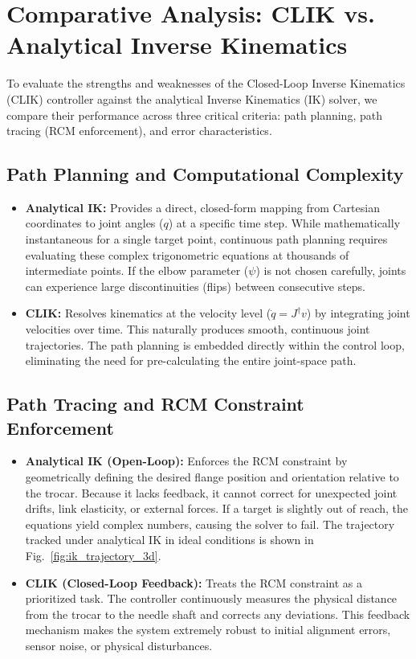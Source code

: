 \documentclass[11pt,a4paper]{article}
\begin{document}
\section{Comparative Analysis: CLIK vs. Analytical Inverse Kinematics}
To evaluate the strengths and weaknesses of the Closed-Loop Inverse Kinematics (CLIK) controller against the analytical Inverse Kinematics (IK) solver, we compare their performance across three critical criteria: path planning, path tracing (RCM enforcement), and error characteristics.

\subsection{Path Planning and Computational Complexity}
\begin{itemize}
    \item \textbf{Analytical IK:} Provides a direct, closed-form mapping from Cartesian coordinates to joint angles ($q$) at a specific time step. While mathematically instantaneous for a single target point, continuous path planning requires evaluating these complex trigonometric equations at thousands of intermediate points. If the elbow parameter ($\psi$) is not chosen carefully, joints can experience large discontinuities (flips) between consecutive steps.
    \item \textbf{CLIK:} Resolves kinematics at the velocity level ($\dot{q} = J^{\dagger} v$) by integrating joint velocities over time. This naturally produces smooth, continuous joint trajectories. The path planning is embedded directly within the control loop, eliminating the need for pre-calculating the entire joint-space path.
\end{itemize}

\subsection{Path Tracing and RCM Constraint Enforcement}
\begin{itemize}
    \item \textbf{Analytical IK (Open-Loop):} Enforces the RCM constraint by geometrically defining the desired flange position and orientation relative to the trocar. Because it lacks feedback, it cannot correct for unexpected joint drifts, link elasticity, or external forces. If a target is slightly out of reach, the equations yield complex numbers, causing the solver to fail. The trajectory tracked under analytical IK in ideal conditions is shown in Fig.~\ref{fig:ik_trajectory_3d}.
    \item \textbf{CLIK (Closed-Loop Feedback):} Treats the RCM constraint as a prioritized task. The controller continuously measures the physical distance from the trocar to the needle shaft and corrects any deviations. This feedback mechanism makes the system extremely robust to initial alignment errors, sensor noise, or physical disturbances.
\end{itemize}
\end{document}
